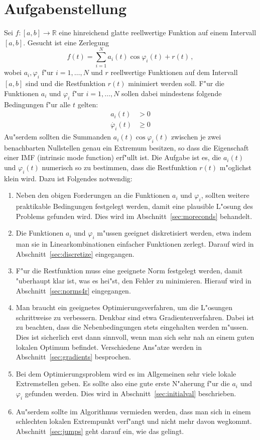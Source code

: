 \documentclass[a4paper]{scrartcl}
\newcommand{\R}{{\mathbb{R}}}
\newcommand{\pphi}{{\varphi}}
\begin{document}
\tableofcontents

\section{Aufgabenstellung}

Sei $f:[a,b]\to\R$ eine hinreichend glatte reellwertige Funktion auf einem Intervall $[a,b]$. 
Gesucht ist eine Zerlegung
$$ f(t) = \sum_{i=1}^N a_i(t)\cos\pphi_i(t) + r(t)\,, $$
wobei $a_i,\pphi_i$ f"ur $i=1,\dotsc,N$ und $r$ reellwertige Funktionen auf dem Intervall $[a,b]$ sind und die Restfunktion $r(t)$ minimiert werden soll. 
F"ur die Funktionen $a_i$ und $\pphi_i$ f"ur $i=1,\dotsc,N$ sollen dabei mindestens folgende Bedingungen f"ur alle $t$ gelten:
\begin{align*}
  a_i(t) &> 0 \\
  \dot{\pphi_i}(t) &\ge 0
\end{align*}
Au"serdem sollten die Summanden $a_i(t)\cos\pphi_i(t)$ zwischen je zwei benachbarten Nullstellen genau ein Extremum besitzen, so dass die Eigenschaft einer IMF (intrinsic mode function) erf"ullt ist. 
Die Aufgabe ist es, die $a_i(t)$ und $\pphi_i(t)$ numerisch so zu bestimmen, dass die Restfunktion $r(t)$ m"oglichst klein wird. 
Dazu ist Folgendes notwendig:
\begin{enumerate}
  \item Neben den obigen Forderungen an die Funktionen $a_i$ und $\pphi_i$, sollten weitere praktikable Bedingungen festgelegt werden, damit eine plausible L"osung des Problems gefunden wird. 
  Dies wird im Abschnitt~\ref{sec:moreconds} behandelt. 
  \item Die Funktionen $a_i$ und $\pphi_i$ m"ussen geeignet diskretisiert werden, etwa indem man sie in Linearkombinationen einfacher Funktionen zerlegt. 
  Darauf wird in Abschnitt~\ref{sec:discretize} eingegangen.
  \item F"ur die Restfunktion muss eine geeignete Norm festgelegt werden, damit "uberhaupt klar ist, was es hei"st, den Fehler zu minimieren. 
  Hierauf wird in Abschnitt~\ref{sec:norms4r} eingegangen.
  \item Man braucht ein geeignetes Optimierungsverfahren, um die L"osungen schrittweise zu verbessern. 
  Denkbar sind etwa Gradientenverfahren. Dabei ist zu beachten, dass die Nebenbedingungen stets eingehalten werden m"ussen. 
  Dies ist sicherlich erst dann sinnvoll, wenn man sich sehr nah an einem guten lokalen Optimum befindet. 
  Verschiedene Ans"atze werden in Abschnitt~\ref{sec:gradients} besprochen.
  \item Bei dem Optimierungsproblem wird es im Allgemeinen sehr viele lokale Extremstellen geben. 
  Es sollte also eine gute erste N"aherung f"ur die $a_i$ und $\pphi_i$ gefunden werden. 
  Dies wird in Abschnitt~\ref{sec:initialval} beschrieben. 
  \item Au"serdem sollte im Algorithmus vermieden werden, dass man sich in einem schlechten lokalen Extrempunkt verf"angt und nicht mehr davon wegkommt. 
  Abschnitt~\ref{sec:jumps} geht darauf ein, wie das gelingt.
\end{enumerate}
\end{document}
